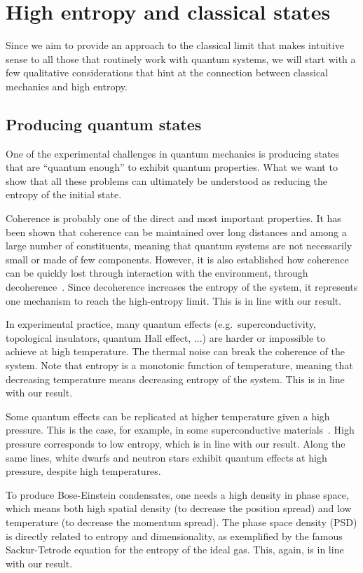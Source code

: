 \documentclass{article}
\begin{document}
\section{High entropy and classical states}

Since we aim to provide an approach to the classical limit that makes intuitive sense to all those that routinely work with quantum systems, we will start with a few qualitative considerations that hint at the connection between classical mechanics and high entropy.

\subsection{Producing quantum states}

One of the experimental challenges in quantum mechanics is producing states that are ``quantum enough'' to exhibit quantum properties. What we want to show that all these problems can ultimately be understood as reducing the entropy of the initial state.

Coherence is probably one of the direct and most important properties. It has been shown that coherence can be maintained over long distances and among a large number of constituents, meaning that quantum systems are not necessarily small or made of few components. However, it is also established how coherence can be quickly lost through interaction with the environment, through decoherence~\cite{RevModPhys.75.715, SCHLOSSHAUER20191}. Since decoherence increases the entropy of the system, it represents one mechanism to reach the high-entropy limit. This is in line with our result.

In experimental practice, many quantum effects (e.g.~superconductivity, topological insulators, quantum Hall effect, ...) are harder or impossible to achieve at high temperature. The thermal noise can break the coherence of the system. Note that entropy is a monotonic function of temperature, meaning that decreasing temperature means decreasing entropy of the system. This is in line with our result.

Some quantum effects can be replicated at higher temperature given a high pressure. This is the case, for example, in some superconductive materials~\cite{Drozdov:2015}. High pressure corresponds to low entropy, which is in line with our result. Along the same lines, white dwarfs and neutron stars exhibit quantum effects at high pressure, despite high temperatures.

To produce Bose-Einstein condensates, one needs a high density in phase space, which means both high spatial density (to decrease the position spread) and low temperature (to decrease the momentum spread). The phase space density (PSD) is directly related to entropy and dimensionality, as exemplified by the famous Sackur-Tetrode equation for the entropy of the ideal gas. This, again, is in line with our result.
\end{document}
